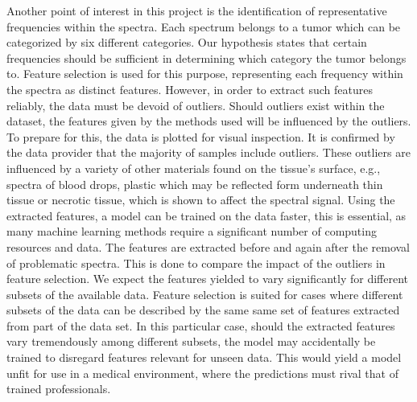 Another point of interest in this project is the identification of representative frequencies within the spectra. Each spectrum belongs to a tumor which can be categorized by six different categories. Our hypothesis states that certain frequencies should be sufficient in determining which category the tumor belongs to. Feature selection is used for this purpose, representing each frequency within the spectra as distinct features. However, in order to extract such features reliably, the data must be devoid of outliers. Should outliers exist within the dataset, the features given by the methods used will be influenced by the outliers. To prepare for this, the data is plotted for visual inspection. It is confirmed by the data provider that the majority of samples include outliers. These outliers are influenced by a variety of other materials found on the tissue's surface, e.g., spectra of blood drops, plastic which may be reflected form underneath thin tissue or necrotic tissue, which is shown to affect the spectral signal. Using the extracted features, a model can be trained on the data faster,  this is essential, as many machine learning methods require a significant number of computing resources and data. The features are extracted before and again after the removal of problematic spectra. This is done to compare the impact of the outliers in feature selection. We expect the features yielded to vary significantly for different subsets of the available data. Feature selection is suited for cases where different subsets of the data can be described by the same same set of features extracted from part of the data set. In this particular case, should the extracted features vary tremendously among different subsets, the model may accidentally be trained to disregard features relevant for unseen data. This would yield a model unfit for use in a medical environment, where the predictions must rival that of trained professionals.


